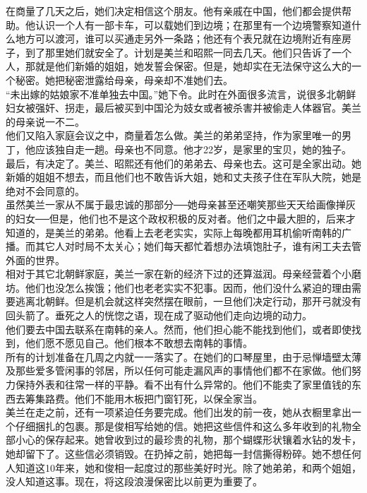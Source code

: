 在商量了几天之后，她们决定相信这个朋友。他有亲戚在中国，他们都会提供帮助。他认识一个人有一部卡车，可以载她们到边境；在那里有一个边境警察知道什么地方可以渡河，谁可以买通走另外一条路；他还有个表兄就在边境附近有座房子，到了那里她们就安全了。计划是美兰和昭熙一同去几天。他们只告诉了一个人，那就是他们新婚的姐姐，她发誓会保密。但是，她却实在无法保守这么大的一个秘密。她把秘密泄露给母亲，母亲却不准她们去。\\

“未出嫁的姑娘家不准单独去中国。”她下令。此时在外面很多流言，说很多北朝鲜妇女被强奸、拐走，最后被买到中国沦为妓女或者被杀害并被偷走人体器官。美兰的母亲说一不二。\\

他们又陷入家庭会议之中，商量着怎么做。美兰的弟弟坚持，作为家里唯一的男丁，他应该独自走一趟。母亲也不同意。他才22岁，是家里的宝贝，她的独子。\\

最后，有决定了。美兰、昭熙还有他们的弟弟去、母亲也去。这可是全家出动。她新婚的姐姐不想去，而且他们也不敢告诉大姐，她和丈夫孩子住在军队大院，她是绝对不会同意的。\\

虽然美兰一家从不属于最忠诚的那部分──她母亲甚至还嘲笑那些天天给画像掸灰的妇女──但是，他们也不是这个政权积极的反对者。他们之中最大胆的，后来才知道的，是美兰的弟弟。他看上去老老实实，实际上每晚都用耳机偷听南韩的广播。而其它人对时局不太关心；她们每天都忙着想办法填饱肚子，谁有闲工夫去管外面的世界。\\

相对于其它北朝鲜家庭，美兰一家在新的经济下过的还算滋润。母亲经营着个小磨坊。他们也没怎么挨饿；他们也老老实实不犯事。因而，他们没什么紧迫的理由需要逃离北朝鲜。但是机会就这样突然摆在眼前，一旦他们决定行动，那开弓就没有回头箭了。垂死之人的恍惚之语，现在成了驱动他们走向边境的动力。\\

他们要去中国去联系在南韩的亲人。然而，他们担心能不能找到他们，或者即使找到，他们愿不愿见自己。他们根本不敢想去南韩的事情。\\

所有的计划准备在几周之内就一一落实了。在她们的口琴屋里，由于忌惮墙壁太薄及那些爱多管闲事的邻居，所以任何可能走漏风声的事情他们都不在家做。他们努力保持外表和往常一样的平静。看不出有什么异常的。他们不能卖了家里值钱的东西去筹集路费。他们不能用木板把门窗钉死，以保全家当。\\

美兰在走之前，还有一项紧迫任务要完成。他们出发的前一夜，她从衣橱里拿出一个仔细捆扎的包裹。那是俊相写给她的信。她把这些信件和这么多年收到的礼物全部小心的保存起来。她曾收到过的最珍贵的礼物，那个蝴蝶形状镶着水钻的发卡，她却留下了。这些信必须销毁。在扔掉之前，她把每一封信撕得粉碎。她不想任何人知道这10年来，她和俊相一起度过的那些美好时光。除了她弟弟，和两个姐姐，没人知道这事。现在，将这段浪漫保密比以前更为重要了。\\

